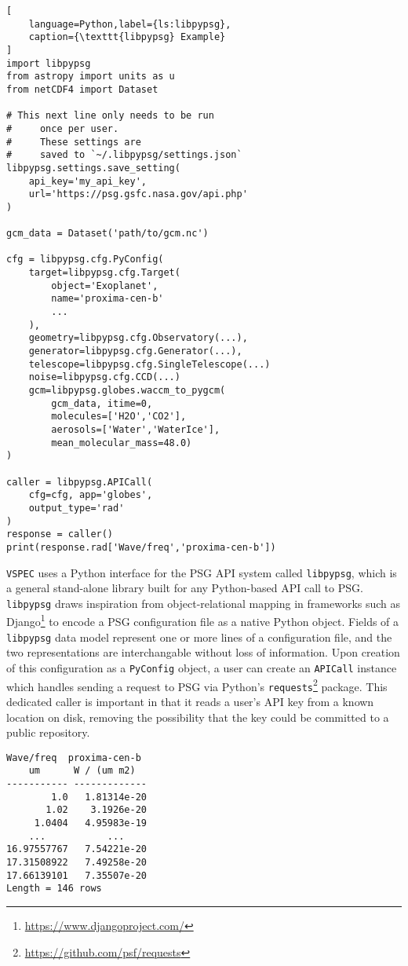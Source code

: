 \documentclass[twocolumn,linenumbers]{aastex631}
\newcommand{\vspec}[1]{\texttt{VSPEC}#1}
\begin{document}
\begin{lstlisting}[
    language=Python,label={ls:libpypsg},
    caption={\texttt{libpypsg} Example}
]
import libpypsg
from astropy import units as u
from netCDF4 import Dataset

# This next line only needs to be run
#     once per user.
#     These settings are 
#     saved to `~/.libpypsg/settings.json`
libpypsg.settings.save_setting(
    api_key='my_api_key',
    url='https://psg.gsfc.nasa.gov/api.php'
)

gcm_data = Dataset('path/to/gcm.nc')

cfg = libpypsg.cfg.PyConfig(
    target=libpypsg.cfg.Target(
        object='Exoplanet',
        name='proxima-cen-b'
        ...
    ),
    geometry=libpypsg.cfg.Observatory(...),
    generator=libpypsg.cfg.Generator(...),
    telescope=libpypsg.cfg.SingleTelescope(...)
    noise=libpypsg.cfg.CCD(...)
    gcm=libpypsg.globes.waccm_to_pygcm(
        gcm_data, itime=0,
        molecules=['H2O','CO2'],
        aerosols=['Water','WaterIce'],
        mean_molecular_mass=48.0)
)

caller = libpypsg.APICall(
    cfg=cfg, app='globes',
    output_type='rad'
)
response = caller()
print(response.rad['Wave/freq','proxima-cen-b'])
\end{lstlisting}

\vspec{} uses a Python interface for the PSG API system called \texttt{libpypsg}, which is a general stand-alone library built for any Python-based API call to PSG. \texttt{libpypsg} draws inspiration from object-relational mapping in frameworks such as Django\footnote{\url{https://www.djangoproject.com/}} to encode a PSG configuration file as a native Python object. Fields of a \texttt{libpypsg} data model represent one or more lines of a configuration file, and the two representations are interchangable without loss of information. Upon creation of this configuration as a \texttt{PyConfig} object, a user can create an \texttt{APICall} instance which handles sending a request to PSG via Python's \texttt{requests}\footnote{\url{https://github.com/psf/requests}} package. This dedicated caller is important in that it reads a user's API key from a known location on disk, removing the possibility that the key could be committed to a public repository.

\begin{lstlisting}[caption={\texttt{libpypsg} Output},label={ls:psgout}]
Wave/freq  proxima-cen-b
    um      W / (um m2) 
----------- -------------
        1.0   1.81314e-20
       1.02    3.1926e-20
     1.0404   4.95983e-19
    ...           ...
16.97557767   7.54221e-20
17.31508922   7.49258e-20
17.66139101   7.35507e-20
Length = 146 rows

\end{lstlisting}
\end{document}
